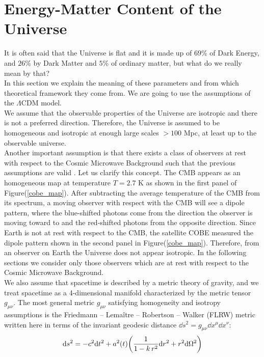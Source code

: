 \documentclass{article}
\begin{document}
\newpage


\section{Energy-Matter Content of the Universe} 
It is often said that the Universe  is flat and it is made up of $69$\% of Dark Energy, and $26 $\% by Dark Matter and $5$\% of ordinary matter, but what do we really mean by that?\\
In this section we explain the meaning of these parameters and from which theoretical framework they come from. 
We are going to use the assumptions of the $\Lambda$CDM model.\\
We assume that the observable properties of the Universe are isotropic and there is not a preferred direction. 
Therefore, the Universe is assumed to be homogeneous and isotropic at enough large scales $> 100$ Mpc, at least up to the observable universe.\\
Another important assumption is that there exists a class of observers at rest with respect to the Cosmic Microwave Background such that the previous assumptions are valid \citep{bartelmannStandardModelCosmology}.
Let us clarify this concept.
The CMB appears as an homogeneous map at temperature $T=2.7$ K as shown in the first panel of Figure(\ref{cobe_map}).
After subtracting the average temperature of the CMB from its spectrum, a moving observer with respect with the CMB will see a dipole pattern, where the blue-shifted photons come from the direction the observer is moving toward to and the red-shifted photons from the opposite direction.
Since Earth is not at rest with respect to the CMB, the satellite COBE measured the dipole pattern shown in the second panel in Figure(\ref{cobe_map}).
Therefore, from an observer on Earth the Universe does not appear isotropic.
In the following sections we consider only those observers which are at rest with respect to the Cosmic Microwave Background.\\
We also assume that spacetime is described by a metric theory of gravity, and we treat spacetime as a 4-dimensional manifold characterized by the metric tensor $g_{\mu \nu}$.
The most general metric $g_{\mu \nu}$ satisfying homogeneity and isotropy assumptions is the Friedmann – Lemaître – Robertson – Walker (FLRW) metric written here in terms of the invariant geodesic distance $\dd s ^2 = g_{\mu \nu} \dd x^{\mu} \dd x^{\nu}$:
\begin{equation}
\label{metric}
\dd s ^2 = -c ^2 \dd t^2 + a^2 (t) \qty( \frac{1}{1-k \, r^2} \dd r^2 + r^2 \dd \Omega ^2 )  
\end{equation}
\end{document}
